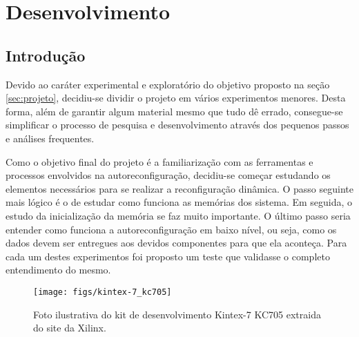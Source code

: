\documentclass[11pt,a4paper,oneside]{book}
\begin{document}
	\frontmatter
	\listoftodos
	\mainmatter
	
\fi
\newcommand\dlq{\lq\lq{}}
\newcommand\drq{\rq\rq{}}

                      
\chapter{Desenvolvimento}\label{CapDesenvolvimento}


\section{Introdu\c{c}\~{a}o}
Devido ao caráter experimental e exploratório do objetivo proposto na seção \ref{sec:projeto}, decidiu-se dividir o projeto em vários experimentos menores.
Desta forma, além de garantir algum material mesmo que tudo dê errado, consegue-se simplificar o processo de pesquisa e desenvolvimento através dos pequenos passos e análises frequentes.

Como o objetivo final do projeto é a familiarização com as ferramentas e processos envolvidos na autoreconfiguração, decidiu-se começar estudando os elementos necessários para se realizar a reconfiguração dinâmica.
O passo seguinte mais lógico é o de estudar como funciona as memórias dos sistema.
Em seguida, o estudo da inicialização da memória se faz muito importante.
O último passo seria entender como funciona a autoreconfiguração em baixo nível, ou seja, como os dados devem ser entregues aos devidos componentes para que ela aconteça.
Para cada um destes experimentos foi proposto um teste que validasse o completo entendimento do mesmo.

\begin{figure}[h]
\centering
\texttt{[image: figs/kintex-7\_kc705]}
\caption{Foto ilustrativa do kit de desenvolvimento Kintex-7 KC705 extraida do site da Xilinx.}
\label{fig:kc705}
\end{figure}
\end{document}
